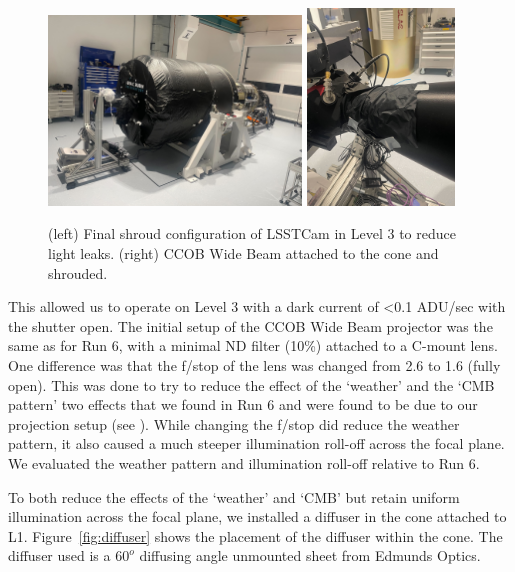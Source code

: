 \begin{figure}[htbp]
\centering
    \includegraphics[width=0.6\textwidth]{figures/Camera_Shroud.jpg} 
    \includegraphics[width=0.35\textwidth]{figures/CCOB_Wide_Shroud.jpg} \\
\caption{(left) Final shroud configuration of LSSTCam in Level 3 to reduce light leaks. (right) CCOB Wide Beam attached to the cone and shrouded.}
\label{fig:LSSTCam_config}
\end{figure}

This allowed us to operate on Level 3 with a dark current of
\textless0.1 ADU/sec with the shutter open. The initial setup of the
CCOB Wide Beam projector was the same as for Run 6, with a minimal ND filter (10\%)
attached to a C-mount lens. One difference was that the f/stop of the lens
was changed from 2.6 to 1.6 (fully open). This was done to try to
reduce the effect of the `weather' and
the `CMB pattern' two effects that we
found in Run 6 and were found to be due to our projection setup (see
\citet{2024arXiv241113386B}). While changing  the f/stop  did
reduce the weather pattern, it also caused a much steeper illumination roll-off
across the focal plane. We evaluated the weather pattern and illumination roll-off relative to Run 6.


To both reduce the effects of the
`weather' and
`CMB' but retain uniform illumination
across the focal plane, we installed a diffuser in the cone attached to
L1. Figure~\ref{fig:diffuser} shows the placement of the diffuser within the cone.  The diffuser used is a $60^o$ diffusing angle unmounted sheet from Edmunds Optics.

